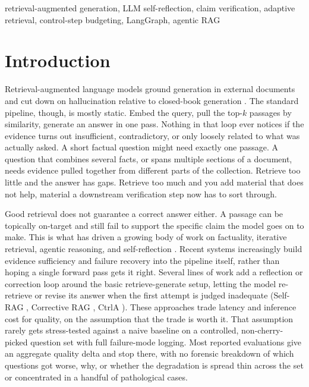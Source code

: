 \documentclass[conference]{IEEEtran}
\begin{document}
\begin{IEEEkeywords}
retrieval-augmented generation, LLM self-reflection, claim verification, adaptive
retrieval, control-step budgeting, LangGraph, agentic RAG
\end{IEEEkeywords}

\section{Introduction}

Retrieval-augmented language models ground generation in external documents and cut
down on hallucination relative to closed-book generation \cite{lewis2020rag}. The
standard pipeline, though, is mostly static. Embed the query, pull the top-$k$
passages by similarity, generate an answer in one pass. Nothing in that loop ever
notices if the evidence turns out insufficient, contradictory, or only loosely related
to what was actually asked. A short factual question might need exactly one passage.
A question that combines several facts, or spans multiple sections of a document,
needs evidence pulled together from different parts of the collection. Retrieve too
little and the answer has gaps. Retrieve too much and you add material that does not
help, material a downstream verification step now has to sort through.

Good retrieval does not guarantee a correct answer either. A passage can be topically
on-target and still fail to support the specific claim the model goes on to make. This
is what has driven a growing body of work on factuality, iterative retrieval, agentic
reasoning, and self-reflection
\cite{maynez2020faithfulness,kryscinski2020factcc,pagnoni2021frank,yao2023react,shinn2023reflexion,singh2025agenticrag,li2025ragreasoning}.
Recent systems increasingly build evidence sufficiency and failure recovery into the
pipeline itself, rather than hoping a single forward pass gets it right. Several lines
of work add a reflection or correction loop around the basic retrieve-generate setup,
letting the model re-retrieve or revise its answer when the first attempt is judged
inadequate (Self-RAG \cite{selfrag}, Corrective RAG \cite{crag}, CtrlA
\cite{liu2025ctrla}). These approaches trade latency and inference cost for quality,
on the assumption that the trade is worth it. That assumption rarely gets
stress-tested against a naive baseline on a controlled, non-cherry-picked question set
with full failure-mode logging. Most reported evaluations give an aggregate quality
delta and stop there, with no forensic breakdown of which questions got worse, why, or
whether the degradation is spread thin across the set or concentrated in a handful of
pathological cases.
\end{document}
